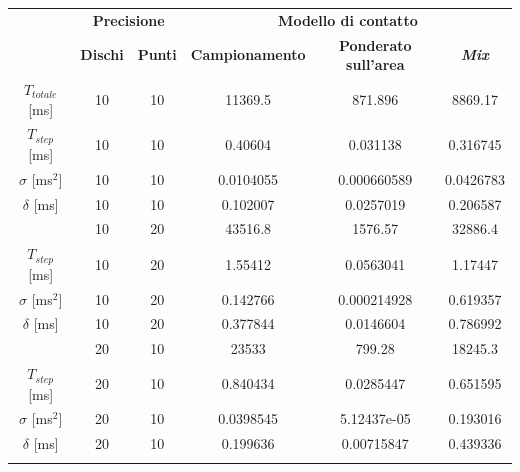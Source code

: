 \begin{table}
	\centering
	\begin{tabular}{c|c|c|c|c|c|}
		\cline{2-6} 
		& \multicolumn{2}{c|}{\textbf{Precisione}} &\multicolumn{3}{c|}{\textbf{Modello di contatto}} \\
		\cline{2-6} 
		& \textbf{Dischi} & \textbf{Punti} & \textbf{Campionamento} & \textbf{Ponderato sull'area} & \textbf{\textit{Mix}} \\ 
		\hline
		\multicolumn{1}{|c|}{$T_{totale}$ [ms]} & 10 & 10 & 11369.5 & 871.896 & 8869.17 \\ 
		\hline 
		\multicolumn{1}{|c|}{$T_{step}$ [ms]} & 10 & 10 & 0.40604 & 0.031138 & 0.316745 \\ 
		\hline 
		\multicolumn{1}{|c|}{$\sigma$ [ms$^2$]} & 10 & 10 & 0.0104055 & 0.000660589 & 0.0426783 \\ 
		\hline 
		\multicolumn{1}{|c|}{$\delta$ [ms]} & 10 & 10 & 0.102007 & 0.0257019 & 0.206587 \\ 
		\hhline{======}
		
		\multicolumn{1}{|c|}{$T_{totale}$ [ms]} & 10 & 20 & 43516.8 & 1576.57 & 32886.4 \\ 
		\hline 
		\multicolumn{1}{|c|}{$T_{step}$ [ms]} & 10 & 20 & 1.55412 & 0.0563041 & 1.17447 \\ 
		\hline 
		\multicolumn{1}{|c|}{$\sigma$ [ms$^2$]} & 10 & 20 & 0.142766 & 0.000214928 & 0.619357 \\ 
		\hline 
		\multicolumn{1}{|c|}{$\delta$ [ms]} & 10 & 20 & 0.377844 & 0.0146604 & 0.786992 \\ 
		\hhline{======}
		
		\multicolumn{1}{|c|}{$T_{totale}$ [ms]} & 20 & 10 & 23533 & 799.28 & 18245.3 \\ 
		\hline 
		\multicolumn{1}{|c|}{$T_{step}$ [ms]} & 20 & 10 & 0.840434 & 0.0285447 & 0.651595 \\ 
		\hline 
		\multicolumn{1}{|c|}{$\sigma$ [ms$^2$]} & 20 & 10 & 0.0398545 & 5.12437e-05 & 0.193016 \\ 
		\hline 
		\multicolumn{1}{|c|}{$\delta$ [ms]} & 20 & 10 & 0.199636 & 0.00715847 & 0.439336 \\ 
		\hhline{======}
		

\end{tabular}
\end{table}
